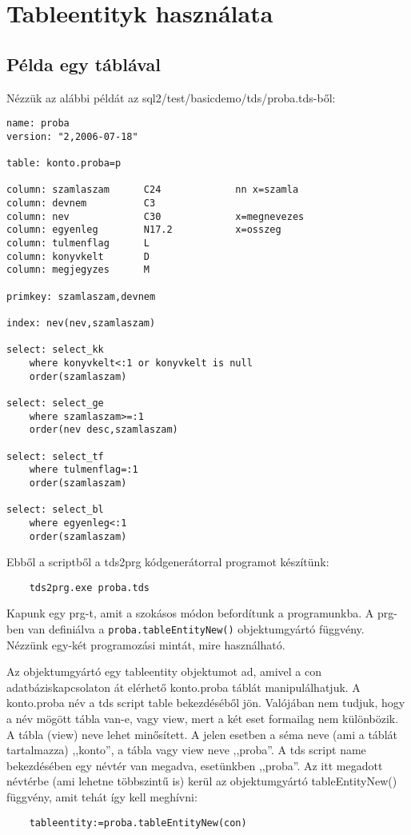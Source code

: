 
\section{Tableentityk használata}



%

\subsection{Példa egy táblával}

Nézzük az alábbi példát az sql2/test/basicdemo/tds/proba.tds-ből:

\begin{verbatim}
name: proba
version: "2,2006-07-18"

table: konto.proba=p

column: szamlaszam      C24             nn x=szamla
column: devnem          C3
column: nev             C30             x=megnevezes
column: egyenleg        N17.2           x=osszeg
column: tulmenflag      L
column: konyvkelt       D
column: megjegyzes      M

primkey: szamlaszam,devnem

index: nev(nev,szamlaszam)

select: select_kk  
    where konyvkelt<:1 or konyvkelt is null 
    order(szamlaszam)

select: select_ge  
    where szamlaszam>=:1 
    order(nev desc,szamlaszam)

select: select_tf
    where tulmenflag=:1
    order(szamlaszam)

select: select_bl
    where egyenleg<:1 
    order(szamlaszam)
\end{verbatim}

Ebből a scriptből a tds2prg kódgenerátorral programot készítünk:
\begin{verbatim}
    tds2prg.exe proba.tds
\end{verbatim}
Kapunk egy prg-t, amit a szokásos módon befordítunk a programunkba.
A prg-ben van definiálva a \verb!proba.tableEntityNew()!
objektumgyártó függvény. Nézzünk egy-két programozási mintát, 
mire használható.

Az objektumgyártó egy tableentity objektumot ad, 
amivel a con adatbáziskapcsolaton át elérhető konto.proba 
táblát manipulálhatjuk. A konto.proba név a tds script table 
bekezdéséből jön. Valójában nem tudjuk, 
hogy a név mögött tábla van-e, vagy view, mert a két eset formailag 
nem különbözik.
A tábla (view) neve lehet minősített. A jelen esetben a séma neve 
(ami a táblát tartalmazza) ,,konto'', a tábla vagy view neve ,,proba''.
A tds script name bekezdésében egy névtér van megadva, esetünkben ,,proba''. 
Az itt megadott névtérbe (ami lehetne többszintű is) kerül az objektumgyártó
tableEntityNew() függvény, amit tehát így kell meghívni:
\begin{verbatim}
    tableentity:=proba.tableEntityNew(con)
\end{verbatim}

